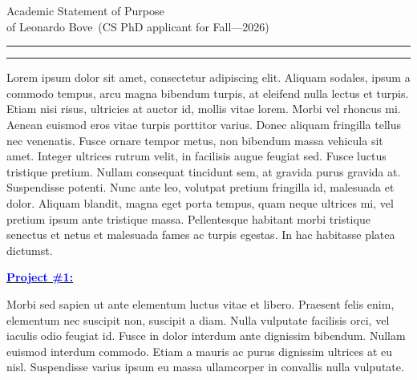 \documentclass{article}
\newcommand{\soptitle}{Academic Statement of Purpose}
\newcommand{\yourname}{Leonardo Bove}
\newcommand{\statement}[1]{\par\medskip
    \underline{\textcolor{blue}{\textbf{#1:}}}\space
}
\begin{document}
    
    \begin{center}\LARGE\soptitle\\
        \large of \yourname\ (CS PhD applicant for Fall---2026)
    \end{center}
    
    \hrule
    \vspace{1pt}
    \hrule height 1pt
    
    \bigskip
    
    Lorem ipsum dolor sit amet, consectetur adipiscing elit. Aliquam
    sodales, ipsum a commodo tempus, arcu magna bibendum turpis, at
    eleifend nulla lectus et turpis. Etiam nisi risus, ultricies at auctor
    id, mollis vitae lorem. Morbi vel rhoncus mi. Aenean euismod eros
    vitae turpis porttitor varius. Donec aliquam fringilla tellus nec
    venenatis. Fusce ornare tempor metus, non bibendum massa vehicula sit
    amet. Integer ultrices rutrum velit, in facilisis augue feugiat sed.
    Fusce luctus tristique pretium. Nullam consequat tincidunt sem, at
    gravida purus gravida at. Suspendisse potenti. Nunc ante leo, volutpat
    pretium fringilla id, malesuada et dolor. Aliquam blandit, magna eget
    porta tempus, quam neque ultrices mi, vel pretium ipsum ante tristique
    massa. Pellentesque habitant morbi tristique senectus et netus et
    malesuada fames ac turpis egestas. In hac habitasse platea dictumst.
    
    \statement{Project \#1}
    Morbi sed sapien ut ante elementum luctus vitae et libero. Praesent
    felis enim, elementum nec suscipit non, suscipit a diam. Nulla
    vulputate facilisis orci, vel iaculis odio feugiat id. Fusce in dolor
    interdum ante dignissim bibendum. Nullam euismod interdum commodo.
    Etiam a mauris ac purus dignissim ultrices at eu nisl. Suspendisse
    varius ipsum eu massa ullamcorper in convallis nulla vulputate.
    
\end{document}
